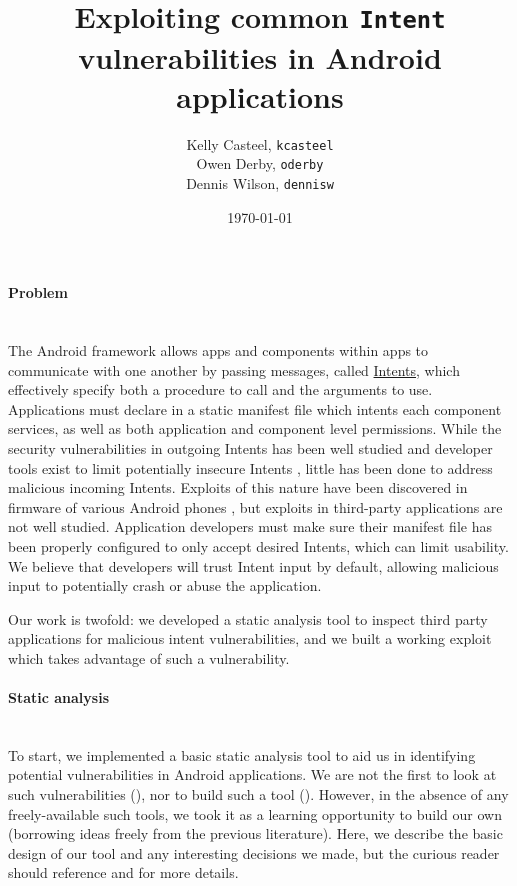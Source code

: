 \documentclass[12pt,a4paper]{article}
\title{Exploiting common \texttt{Intent} vulnerabilities in Android %
applications}
\date{\today}
\author{Kelly Casteel, \texttt{kcasteel}\\Owen Derby, \texttt{oderby}\\Dennis
 Wilson, \texttt{dennisw}}
\begin{document}
 

\maketitle

\paragraph{Problem} ~\\

The Android framework allows apps and components within apps to communicate with
one another by passing messages, called
\href{https://developer.android.com/reference/android/content/Intent.html}{Intents},
which effectively specify both a procedure to call and the arguments to
use. Applications must declare in a static manifest file which intents each
component services, as well as both application and component level
permissions. While the security vulnerabilities in outgoing Intents has been
well studied \cite{chin_analyzing_2011} and developer tools exist to limit
potentially insecure Intents \cite{lu_chex_2012}, little has been
done to address malicious incoming Intents. Exploits of this nature have been
discovered in firmware of various Android phones \cite{grace_systematic_2012},
but exploits in third-party applications are not well studied. Application
developers must make sure their manifest file has been properly configured to
only accept desired Intents, which can limit usability. We believe that
developers will trust Intent input by default, allowing malicious input to
potentially crash or abuse the application.

Our work is twofold: we developed a static analysis tool to inspect third party
applications for malicious intent vulnerabilities, and we built a working
exploit which takes advantage of such a vulnerability.

\paragraph{Static analysis} ~\\

To start, we implemented a basic static analysis tool to aid us in identifying
potential vulnerabilities in Android applications. We are not the first to look
at such vulnerabilities (\cite{chin_analyzing_2011}), nor to build such a tool
(\cite{grace_systematic_2012}). However, in the absence of any freely-available
such tools, we took it as a learning opportunity to build our own (borrowing
ideas freely from the previous literature). Here, we describe the basic design
of our tool and any interesting decisions we made, but the curious reader should
reference \cite{chin_analyzing_2011} and \cite{grace_systematic_2012} for more
details.
\end{document}

